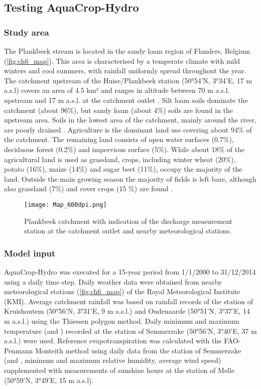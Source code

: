 \subsection{Testing AquaCrop-Hydro}
\subsubsection{Study area}	
The Plankbeek stream is located in the sandy loam region of Flanders, Belgium (\autoref{fig:ch6_map}). This area is characterised by a temperate climate with mild winters and cool summers, with rainfall uniformly spread throughout the year. The catchment upstream of the Huise/Plankbeek station (50°54'N, 3°34'E, 17 m a.s.l) covers an area of 4.5 km² and ranges in altitude between 70 m a.s.l. upstream and 17 m a.s.l. at the catchment outlet \parencite{agiv2006}. Silt loam soils dominate the catchment (about 96\%), but sandy loam (about 4\%) soils are found in the upstream area. Soils in the lowest area of the catchment, mainly around the river, are poorly drained \parencite{dov2014}. Agriculture is the dominant land use covering about 94\% of the catchment. The remaining land consists of open water surfaces (0.7\%), deciduous forest (0.2\%) and impervious surface (5\%). While about 18\% of the agricultural land is used as grassland, crops, including winter wheat (20\%), potato (16\%), maize (14\%) and sugar beet (11\%), occupy the majority of the land. Outside the main growing season the majority of fields is left bare, although also grassland (7\%) and cover crops (15 \%) are found \parencite{agiv2014, agiv2001,vlm2014}.
 
 \begin{figure}[tbhp]
	\centering
		\texttt{[image: Map\_600dpi.png]}
	\caption{Plankbeek catchment with indication of the discharge measurement station at the catchment outlet and nearby meteorological stations. }
	\label{fig:ch6_map}
\end{figure}

\subsubsection{Model input}
AquaCrop-Hydro was executed for a 15-year period from 1/1/2000 to 31/12/2014 using a daily time step. Daily weather data were obtained from nearby meteorological stations (\autoref{fig:ch6_map}) of the Royal Meteorological Institute (KMI). Average catchment rainfall was based on rainfall records of the station of Kruishoutem (50°56'N, 3°31'E, 9 m a.s.l.) and Oudenaarde (50°51'N, 3°37'E, 14 m a.s.l.) using the Thiessen polygon method. Daily minimum and maximum temperature (\Tmin and \Tmax) recorded at the station of Semmerzake (50°56'N, 3°40'E, 37 m a.s.l.) were used. Reference evapotranspiration was calculated with the FAO-Penmann Monteith method using daily data from the station of Semmerzake (\Tmin and \Tmax, minimum and maximum relative humidity, average wind speed) supplemented with measurements of sunshine hours at the station of Melle (50°59'N, 3°49'E, 15 m a.s.l). 


